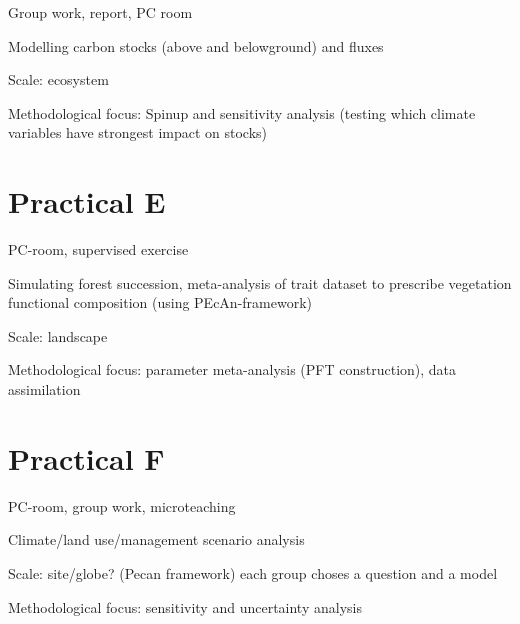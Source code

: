 \documentclass[
  oneside]{book}
\begin{document}
Group work, report, PC room

Modelling carbon stocks (above and belowground) and fluxes

Scale: ecosystem

Methodological focus: Spinup and sensitivity analysis (testing which climate variables have strongest impact on stocks)

\hypertarget{practical-e}{%
\chapter*{Practical E}\label{practical-e}}

PC-room, supervised exercise

Simulating forest succession, meta-analysis of trait dataset to prescribe vegetation functional composition (using PEcAn-framework)

Scale: landscape

Methodological focus: parameter meta-analysis (PFT construction), data assimilation

\hypertarget{practical-f}{%
\chapter*{Practical F}\label{practical-f}}

PC-room, group work, microteaching

Climate/land use/management scenario analysis

Scale: site/globe? (Pecan framework) each group choses a question and a model

Methodological focus: sensitivity and uncertainty analysis

  
\end{document}
